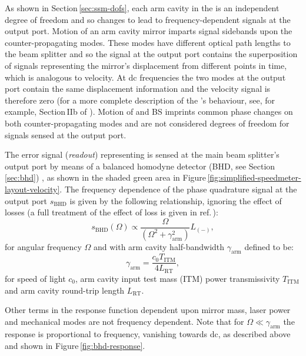 As shown in Section\,\ref{sec:ssm-dofs}, each arm cavity in the \SSM{} is an independent degree of freedom and so changes to \LMINUS{} lead to frequency-dependent signals at the output port. Motion of an arm cavity mirror imparts signal sidebands upon the counter-propagating modes. These modes have different optical path lengths to the beam splitter and so the signal at the output port contains the superposition of signals representing the mirror's displacement from different points in time, which is analogous to velocity. At dc frequencies the two modes at the output port contain the same displacement information and the velocity signal is therefore zero (for a more complete description of the \SSM{}'s behaviour, see, for example, Section\,IIb of \cite{Chen2003}). Motion of \MINT{} and BS imprints common phase changes on both counter-propagating modes and are not considered degrees of freedom for signals sensed at the output port.

The error signal (\emph{readout}) representing \LMINUS{} is sensed at the main beam splitter's output port by means of a balanced homodyne detector (\gls{BHD}, see Section\,\ref{sec:bhd}) \cite{Steinlechner2015}, as shown in the shaded green area in Figure\,\ref{fig:simplified-speedmeter-layout-velocity}. The frequency dependence of the phase quadrature signal at the output port $s_{\textrm{BHD}}$ is given by the following relationship, ignoring the effect of losses (a full treatment of the effect of loss is given in ref.\,\cite{Danilishin2015}):
\begin{equation}
  \label{eq:asymdarmbhdresponse}
  s_{\textrm{BHD}} \left( \Omega \right) \propto \frac{\Omega}{ \left(\Omega^2 + \gamma_{\textrm{arm}}^2 \right)} L_{\left(-\right)},
\end{equation}
for angular frequency $\Omega$ and with arm cavity half-bandwidth $\gamma_{\textrm{arm}}$ defined to be:
\begin{equation}
  \gamma_{\textrm{arm}} = \frac{c_{0} T_{\textrm{ITM}}}{4 L_{\textrm{RT}}},
\end{equation}
for speed of light $c_{0}$, arm cavity input test mass (\gls{ITM}) power transmissivity $T_{\textrm{ITM}}$ and arm cavity round-trip length $L_{\textrm{RT}}$.
   
Other terms in the response function dependent upon mirror mass, laser power and mechanical modes are not frequency dependent. Note that for $\Omega \ll \gamma_{\textrm{arm}}$ the response is proportional to frequency, vanishing towards dc, as described above and shown in Figure\,\ref{fig:bhd-response}.

